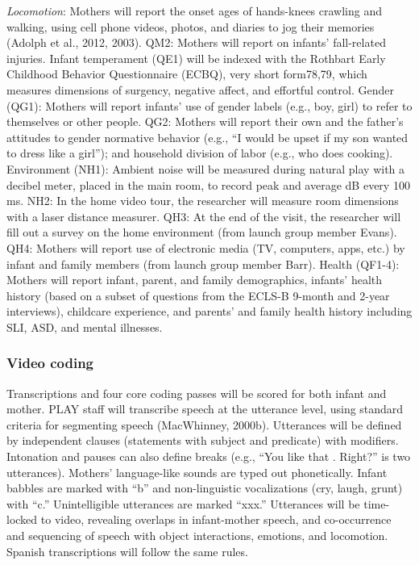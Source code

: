 \documentclass[english,man]{apa6}
\theoremstyle{definition}
\theoremstyle{definition}
\theoremstyle{definition}
\theoremstyle{remark}
\begin{document}
\emph{Locomotion}: Mothers will report the onset ages of hands-knees
crawling and walking, using cell phone videos, photos, and diaries to
jog their memories (Adolph et al., 2012, 2003). QM2: Mothers will report
on infants' fall-related injuries. Infant temperament (QE1) will be
indexed with the Rothbart Early Childhood Behavior Questionnaire (ECBQ),
very short form78,79, which measures dimensions of surgency, negative
affect, and effortful control. Gender (QG1): Mothers will report
infants' use of gender labels (e.g., boy, girl) to refer to themselves
or other people. QG2: Mothers will report their own and the father's
attitudes to gender normative behavior (e.g., \enquote{I would be upset
if my son wanted to dress like a girl}); and household division of labor
(e.g., who does cooking). Environment (NH1): Ambient noise will be
measured during natural play with a decibel meter, placed in the main
room, to record peak and average dB every 100 ms. NH2: In the home video
tour, the researcher will measure room dimensions with a laser distance
measurer. QH3: At the end of the visit, the researcher will fill out a
survey on the home environment (from launch group member Evans). QH4:
Mothers will report use of electronic media (TV, computers, apps, etc.)
by infant and family members (from launch group member Barr). Health
(QF1-4): Mothers will report infant, parent, and family demographics,
infants' health history (based on a subset of questions from the ECLS-B
9-month and 2-year interviews), childcare experience, and parents' and
family health history including SLI, ASD, and mental illnesses.

\subsubsection{Video coding}\label{video-coding-1}

Transcriptions and four core coding passes will be scored for both
infant and mother. PLAY staff will transcribe speech at the utterance
level, using standard criteria for segmenting speech (MacWhinney,
2000b). Utterances will be defined by independent clauses (statements
with subject and predicate) with modifiers. Intonation and pauses can
also define breaks (e.g., \enquote{You like that . Right?} is two
utterances). Mothers' language-like sounds are typed out phonetically.
Infant babbles are marked with \enquote{b} and non-linguistic
vocalizations (cry, laugh, grunt) with \enquote{c.} Unintelligible
utterances are marked \enquote{xxx.} Utterances will be time-locked to
video, revealing overlaps in infant-mother speech, and co-occurrence and
sequencing of speech with object interactions, emotions, and locomotion.
Spanish transcriptions will follow the same rules.
\end{document}
